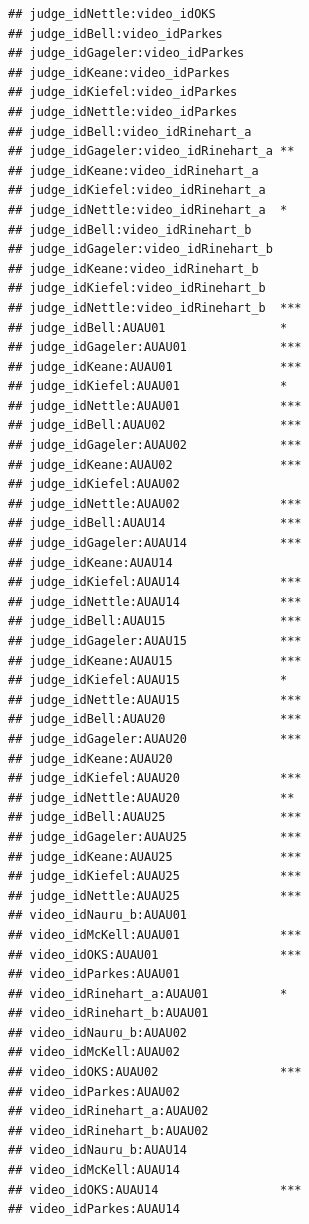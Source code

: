 \documentclass{monashthesis}
\begin{document}
\begin{verbatim}
## judge_idNettle:video_idOKS            
## judge_idBell:video_idParkes           
## judge_idGageler:video_idParkes        
## judge_idKeane:video_idParkes          
## judge_idKiefel:video_idParkes         
## judge_idNettle:video_idParkes         
## judge_idBell:video_idRinehart_a       
## judge_idGageler:video_idRinehart_a ** 
## judge_idKeane:video_idRinehart_a      
## judge_idKiefel:video_idRinehart_a     
## judge_idNettle:video_idRinehart_a  *  
## judge_idBell:video_idRinehart_b       
## judge_idGageler:video_idRinehart_b    
## judge_idKeane:video_idRinehart_b      
## judge_idKiefel:video_idRinehart_b     
## judge_idNettle:video_idRinehart_b  ***
## judge_idBell:AUAU01                *  
## judge_idGageler:AUAU01             ***
## judge_idKeane:AUAU01               ***
## judge_idKiefel:AUAU01              *  
## judge_idNettle:AUAU01              ***
## judge_idBell:AUAU02                ***
## judge_idGageler:AUAU02             ***
## judge_idKeane:AUAU02               ***
## judge_idKiefel:AUAU02                 
## judge_idNettle:AUAU02              ***
## judge_idBell:AUAU14                ***
## judge_idGageler:AUAU14             ***
## judge_idKeane:AUAU14                  
## judge_idKiefel:AUAU14              ***
## judge_idNettle:AUAU14              ***
## judge_idBell:AUAU15                ***
## judge_idGageler:AUAU15             ***
## judge_idKeane:AUAU15               ***
## judge_idKiefel:AUAU15              *  
## judge_idNettle:AUAU15              ***
## judge_idBell:AUAU20                ***
## judge_idGageler:AUAU20             ***
## judge_idKeane:AUAU20                  
## judge_idKiefel:AUAU20              ***
## judge_idNettle:AUAU20              ** 
## judge_idBell:AUAU25                ***
## judge_idGageler:AUAU25             ***
## judge_idKeane:AUAU25               ***
## judge_idKiefel:AUAU25              ***
## judge_idNettle:AUAU25              ***
## video_idNauru_b:AUAU01                
## video_idMcKell:AUAU01              ***
## video_idOKS:AUAU01                 ***
## video_idParkes:AUAU01                 
## video_idRinehart_a:AUAU01          *  
## video_idRinehart_b:AUAU01             
## video_idNauru_b:AUAU02                
## video_idMcKell:AUAU02                 
## video_idOKS:AUAU02                 ***
## video_idParkes:AUAU02                 
## video_idRinehart_a:AUAU02             
## video_idRinehart_b:AUAU02             
## video_idNauru_b:AUAU14                
## video_idMcKell:AUAU14                 
## video_idOKS:AUAU14                 ***
## video_idParkes:AUAU14                 

\end{verbatim}
\end{document}
